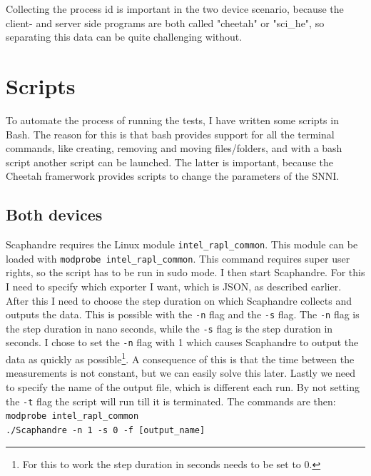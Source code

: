 \documentclass[../thesis.tex]{subfiles}
\begin{document}
Collecting the process id is important in the two device scenario, because the client- and server side programs are both called "cheetah" or "sci\_he", so separating this data can be quite challenging without.     

\section{Scripts}
To automate the process of running the tests, I have written some scripts in Bash. The reason for this is that bash provides support for all the terminal commands, like creating, removing and moving files/folders, and with a bash script another script can be launched. The latter is important, because the Cheetah framerwork provides scripts to change the parameters of the SNNI.

\subsection{Both devices}
Scaphandre requires the Linux module \verb|intel_rapl_common|. This module can be loaded with \verb|modprobe intel_rapl_common|. This command requires super user rights, so the script has to be run in sudo mode. I then start Scaphandre. For this I need to specify which exporter I want, which is JSON, as described earlier. After this I need to choose the step duration on which Scaphandre collects and outputs the data. This is possible with the \verb|-n| flag and the \verb|-s| flag. The \verb|-n| flag is the step duration in nano seconds, while the \verb|-s| flag is the step duration in seconds. I chose to set the \verb|-n| flag with 1 which causes Scaphandre to output the data as quickly as possible\footnote{For this to work the step duration in seconds needs to be set to 0.}. A consequence of this is that the time between the measurements is not constant, but we can easily solve this later. Lastly we need to specify the name of the output file, which is different each run. By not setting the \verb|-t| flag the script will run till it is terminated. The commands are then:\\

\noindent\verb|modprobe intel_rapl_common|\\
\verb|./Scaphandre -n 1 -s 0 -f [output_name]|\\
\end{document}

